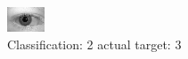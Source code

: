 \begin{figure}[h!]
\begin{center}
\includegraphics[width=0.60\columnwidth]{figures/ID669_class_2_target_3.png}
\end{center}
\caption{ Classification: 2 actual target: 3}
\label{fig:ID669_class_2_target_3}
\end{figure}
